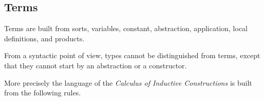 




\subsection{Terms}
\label{cic:terms}

Terms are built from sorts, variables, constant,
abstraction, application, local definitions,
and products.

From a syntactic point of view, types cannot be distinguished from terms,
except that they cannot start by an abstraction or a constructor.

More precisely the language of the {\em Calculus of Inductive
  Constructions} is built from the following rules.

